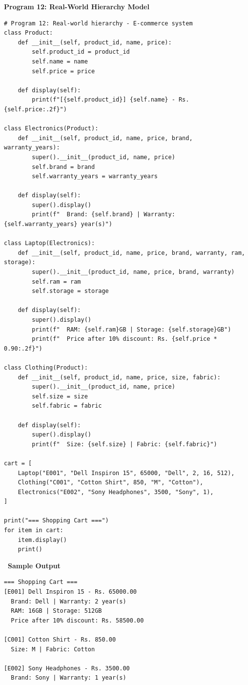 \documentclass[12pt,a4paper]{article}
\newcommand{\outhead}{\noindent\colorbox{cmrgreen!25}%
  {\textbf{\small\color{cmrdark}~Sample Output~}}\par\vspace{-1pt}}
\begin{document}
\textbf{Program 12: Real-World Hierarchy Model}

\begin{lstlisting}
# Program 12: Real-world hierarchy - E-commerce system
class Product:
    def __init__(self, product_id, name, price):
        self.product_id = product_id
        self.name = name
        self.price = price

    def display(self):
        print(f"[{self.product_id}] {self.name} - Rs. {self.price:.2f}")

class Electronics(Product):
    def __init__(self, product_id, name, price, brand, warranty_years):
        super().__init__(product_id, name, price)
        self.brand = brand
        self.warranty_years = warranty_years

    def display(self):
        super().display()
        print(f"  Brand: {self.brand} | Warranty: {self.warranty_years} year(s)")

class Laptop(Electronics):
    def __init__(self, product_id, name, price, brand, warranty, ram, storage):
        super().__init__(product_id, name, price, brand, warranty)
        self.ram = ram
        self.storage = storage

    def display(self):
        super().display()
        print(f"  RAM: {self.ram}GB | Storage: {self.storage}GB")
        print(f"  Price after 10% discount: Rs. {self.price * 0.90:.2f}")

class Clothing(Product):
    def __init__(self, product_id, name, price, size, fabric):
        super().__init__(product_id, name, price)
        self.size = size
        self.fabric = fabric

    def display(self):
        super().display()
        print(f"  Size: {self.size} | Fabric: {self.fabric}")

cart = [
    Laptop("E001", "Dell Inspiron 15", 65000, "Dell", 2, 16, 512),
    Clothing("C001", "Cotton Shirt", 850, "M", "Cotton"),
    Electronics("E002", "Sony Headphones", 3500, "Sony", 1),
]

print("=== Shopping Cart ===")
for item in cart:
    item.display()
    print()
\end{lstlisting}

\outhead
\begin{lstlisting}[style=outputstyle]
=== Shopping Cart ===
[E001] Dell Inspiron 15 - Rs. 65000.00
  Brand: Dell | Warranty: 2 year(s)
  RAM: 16GB | Storage: 512GB
  Price after 10% discount: Rs. 58500.00

[C001] Cotton Shirt - Rs. 850.00
  Size: M | Fabric: Cotton

[E002] Sony Headphones - Rs. 3500.00
  Brand: Sony | Warranty: 1 year(s)
\end{lstlisting}
\end{document}
